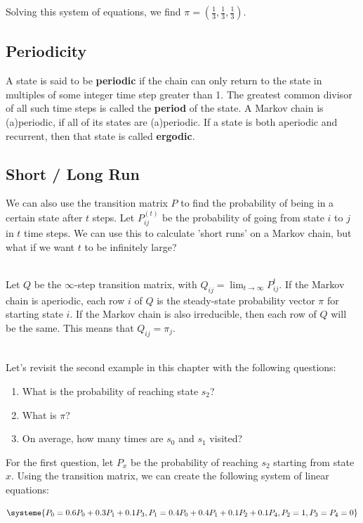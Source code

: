 \documentclass[12pt]{article}
\begin{document}
\noindent
Solving this system of equations, we find $\pi = \left( \frac{1}{3}, \frac{1}{3}, \frac{1}{3} \right)$.

\subsection{Periodicity}
A state is said to be \textbf{periodic} if the chain can only return to the state in multiples of some integer time step greater than 1.
The greatest common divisor of all such time steps is called the \textbf{period} of the state.
A Markov chain is (a)periodic, if all of its states are (a)periodic.
If a state is both aperiodic and recurrent, then that state is called \textbf{ergodic}.

\subsection{Short / Long Run}
We can also use the transition matrix $P$ to find the probability of being in a certain state after $t$ steps.
Let $P_{ij}^{(t)}$ be the probability of going from state $i$ to $j$ in $t$ time steps.
We can use this to calculate 'short runs' on a Markov chain, but what if we want $t$ to be infinitely large?

\noindent
\\
Let $Q$ be the $\infty$-step transition matrix, with $Q_{ij} = \displaystyle\lim_{t \to \infty} P_{ij}^t$.
If the Markov chain is aperiodic, each row $i$ of $Q$ is the steady-state probability vector $\pi$ for starting state $i$.
If the Markov chain is also irreducible, then each row of $Q$ will be the same.
This means that $Q_{ij} = \pi_j$. 

\noindent
\\
Let's revisit the second example in this chapter with the following questions:

\begin{enumerate}
    \item What is the probability of reaching state $s_2$?
    \item What is $\pi$?
    \item On average, how many times are $s_0$ and $s_1$ visited?
\end{enumerate}

\newpage
\noindent
For the first question, let $P_x$ be the probability of reaching $s_2$ starting from state $x$.
Using the transition matrix, we can create the following system of linear equations:

\begin{equation*}
    \systeme{
        P_0 = 0.6P_0 + 0.3P_1 + 0.1P_3,
        P_1 = 0.4P_0 + 0.4P_1 + 0.1P_2 + 0.1P_4,
        P_2 = 1,
        P_3 = P_4 = 0
    }
\end{equation*}
\end{document}
